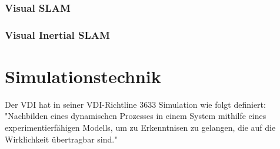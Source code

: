 \subsubsection{Visual \ac{SLAM}}

\subsubsection{Visual Inertial \ac{SLAM}}




\section{Simulationstechnik} \label{simulationstechnik:section}
Der \ac{VDI} hat in seiner \ac{VDI}-Richtline 3633 Simulation wie folgt definiert: "Nachbilden eines dynamischen Prozesses in einem System mithilfe eines experimentierfähigen Modells, um zu Erkenntnisen zu gelangen, die auf die Wirklichkeit übertragbar sind." \cite{VDI-3633}



